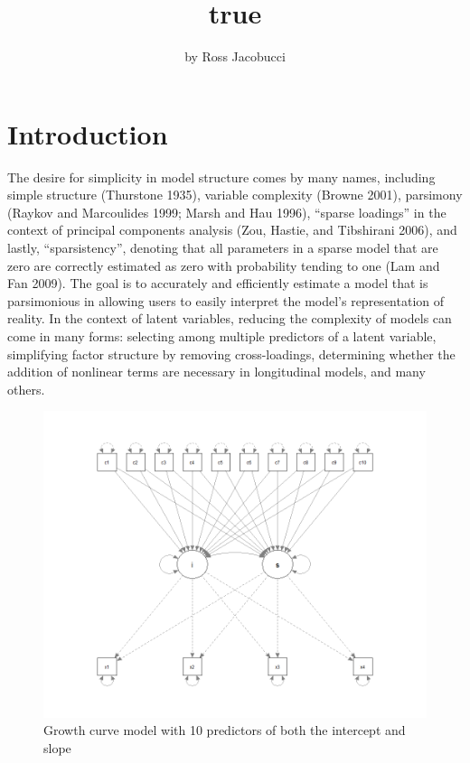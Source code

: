 \title{true}
\author{by Ross Jacobucci}

\maketitle


\section{Introduction}\label{introduction}

The desire for simplicity in model structure comes by many names,
including simple structure (Thurstone 1935), variable complexity (Browne
2001), parsimony (Raykov and Marcoulides 1999; Marsh and Hau 1996),
``sparse loadings'' in the context of principal components analysis
(Zou, Hastie, and Tibshirani 2006), and lastly, ``sparsistency'',
denoting that all parameters in a sparse model that are zero are
correctly estimated as zero with probability tending to one (Lam and Fan
2009). The goal is to accurately and efficiently estimate a model that
is parsimonious in allowing users to easily interpret the model's
representation of reality. In the context of latent variables, reducing
the complexity of models can come in many forms: selecting among
multiple predictors of a latent variable, simplifying factor structure
by removing cross-loadings, determining whether the addition of
nonlinear terms are necessary in longitudinal models, and many others.

\begin{figure}
    \centering
    \includegraphics[width=.5\linewidth]{figs/growth_fig}
    \caption{Growth curve model with 10 predictors of both the intercept and slope}
\end{figure}


